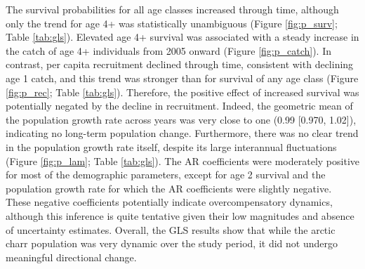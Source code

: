 The survival probabilities for all age classes increased through time,
although only the trend for age 4+ was statistically unambiguous 
(Figure \ref{fig:p_surv}; Table \ref{tab:gls}).
Elevated age 4+ survival was associated with a steady increase in the catch of
age 4+ individuals from 2005 onward (Figure \ref{fig:p_catch}). 
In contrast, per capita recruitment declined through time, 
consistent with declining age 1 catch,
and this trend was stronger than for survival of any age class
(Figure \ref{fig:p_rec}; Table \ref{tab:gls}).
Therefore, the positive effect of increased survival 
was potentially negated by the decline in recruitment.
Indeed, the geometric mean of the population growth rate across years was very close to one
(0.99 [0.970, 1.02]), indicating no long-term population change.
Furthermore, there was no clear trend in the population growth rate itself,
despite its large interannual fluctuations
(Figure \ref{fig:p_lam}; Table \ref{tab:gls}).
The AR coefficients were moderately positive for most of the demographic parameters,
except for age 2 survival and the population growth rate 
for which the AR coefficients were slightly negative.
These negative coefficients potentially indicate overcompensatory dynamics,
although this inference is quite tentative given their low magnitudes 
and absence of uncertainty estimates.
Overall, the GLS results show that while the arctic charr population was very dynamic
over the study period, it did not undergo meaningful directional change.